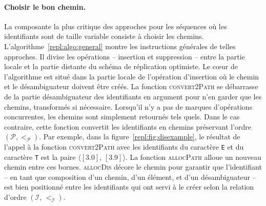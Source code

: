 

\paragraph{Choisir le bon chemin.} La composante la plus critique des approches
pour les séquences où les identifiants sont de taille variable consiste à
choisir les chemins. L'algorithme~\ref{repl:algo:general} montre les
instructions générales de telles approches. Il divise les opérations --
insertion et suppression -- entre la partie locale et la partie distante du
schéma de réplication optimiste. Le cœur de l'algorithme est situé dans la
partie locale de l'opération d'insertion où le chemin et le désambiguateur
doivent être créés. La fonction \textsc{convert2Path} se débarrasse de la partie
désambiguateur des identifiants en argument pour n'en garder que les chemins,
transformés si nécessaire. Lorsqu'il n'y a pas de marques d'opérations
concurrentes, les chemins sont simplement retournés tels quels. Dans le cas
contraire, cette fonction convertit les identifiants en chemins préservant
l'ordre $(\mathcal{P}, <_\mathcal{P})$. Par exemple, dans la
figure~\ref{repl:fig:disexample}, le résultat de l'appel à la fonction
\textsc{convert2Path} avec les identifiants du caractère \texttt{E} et du
caractère \texttt{T} est la paire $\langle [3.0],\, [3.9] \rangle$. La fonction
\textsc{allocPath} alloue un nouveau chemin entre ces bornes. \textsc{allocDis}
décore le chemin pour garantir que l'identifiant -- en tant que composition d'un
chemin, d'un élément, et d'un désambiguateur -- est bien positionné entre les
identifiants qui ont servi à le créer selon la relation d'ordre
$(\mathcal{I},\, <_\mathcal{I})$.


